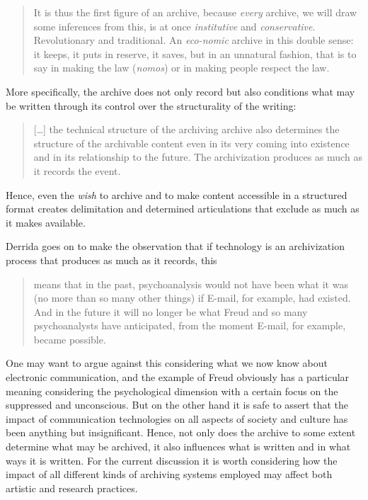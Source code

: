 \documentclass[11pt,a4paper]{article}
\begin{document}
\begin{quote}
  It is thus the first figure of an archive, because \emph{every} archive, we will draw some inferences from this, is at once \emph{institutive} and \emph{conservative}. Revolutionary and traditional. An \emph{eco-nomic} archive in this double sense: it keeps, it puts in reserve, it saves, but in an unnatural fashion, that is to say in making the law (\emph{nomos}) or in making people respect the law. \citep[p. 7]{derrida1998}
\end{quote}
More specifically, the archive does not only record but also conditions what may be written through its control over the structurality of the writing:
\begin{quote}
[\ldots] the technical structure of the archiving archive also determines the structure of the archivable content even in its very coming into existence and in its relationship to the future. The archivization produces as much as it records the event. \citep[p. 17]{derrida1998}
\end{quote}
Hence, even the \emph{wish} to archive and to make content accessible in a structured format creates delimitation and determined articulations that exclude as much as it makes available.

Derrida goes on to make the observation that if technology is an archivization process that produces as much as it records, this
\begin{quote}
means that in the past, psychoanalysis would not have been what it was (no more than so many other things) if E-mail, for example, had existed. And in the future it will no longer be what Freud and so many psychoanalysts have anticipated, from the moment E-mail, for example, became possible. \citep[][p. 17]{derrida1998}
\end{quote}
One may want to argue against this considering what we now know about electronic communication, and the example of Freud obviously has a particular meaning considering the psychological dimension with a certain focus on the suppressed and unconscious. But on the other hand it is safe to assert that the impact of communication technologies on all aspects of society and culture has been anything but insignificant. Hence, not only does the archive to some extent determine what may be archived, it also influences what is written and in what ways it is written. For the current discussion it is worth considering how the impact of all different kinds of archiving systems employed may affect both artistic and research practices.
\end{document}
